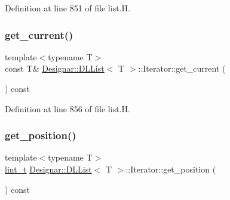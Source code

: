 Definition at line 851 of file list.\+H.

\mbox{\label{class_designar_1_1_d_l_list_1_1_iterator_a337833cfd046d1b1e69e9af95bdc3280}} 
\subsubsection{\texorpdfstring{get\+\_\+current()}{get\_current()}\hspace{0.1cm}{\footnotesize\ttfamily [2/2]}}
{\footnotesize\ttfamily template$<$typename T$>$ \\
const T\& \hyperlink{class_designar_1_1_d_l_list}{Designar\+::\+D\+L\+List}$<$ T $>$\+::Iterator\+::get\+\_\+current (\begin{DoxyParamCaption}{ }\end{DoxyParamCaption}) const\hspace{0.3cm}{\ttfamily [inline]}}



Definition at line 856 of file list.\+H.

\mbox{\label{class_designar_1_1_d_l_list_1_1_iterator_acf69183ba9dedd6fdb7dee8854cfce17}} 
\subsubsection{\texorpdfstring{get\+\_\+position()}{get\_position()}}
{\footnotesize\ttfamily template$<$typename T$>$ \\
\hyperlink{namespace_designar_a9d113d66a39e82b73727c72cd3a52f73}{lint\+\_\+t} \hyperlink{class_designar_1_1_d_l_list}{Designar\+::\+D\+L\+List}$<$ T $>$\+::Iterator\+::get\+\_\+position (\begin{DoxyParamCaption}{ }\end{DoxyParamCaption}) const\hspace{0.3cm}{\ttfamily [inline]}}



